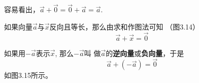 容易看出，$\vec{a}+\vec{0}=\vec{0}+\vec{a}=\vec{a}$.

如果向量$\vec{a}$与$\vec{x}$反向且等长，那么由求和作图法可知
（图3.14）
\[\vec{a}+\vec{x}=\vec{0}\]

如果用$-\vec{a}$表示$\vec{x}$, 那么$-\vec{a}$叫
做$\vec{a}$的\textbf{逆向量}或\textbf{负向量}，于是
\[\vec{a}+(-\vec{a})=\vec{0}\]
如图3.15所示。



\begin{example}
    

\end{example}

\begin{solution}
    
\end{solution}

\begin{example}
    



\end{example}

\begin{solution}
    
\end{solution}

\begin{solution}
    
\end{solution}

























































